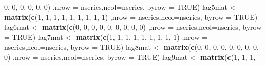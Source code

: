 \documentclass[]{article}
\newenvironment{Shaded}{\begin{snugshade}}{\end{snugshade}}
\newcommand{\KeywordTok}[1]{\textcolor[rgb]{0.13,0.29,0.53}{\textbf{#1}}}
\newcommand{\DataTypeTok}[1]{\textcolor[rgb]{0.13,0.29,0.53}{#1}}
\newcommand{\DecValTok}[1]{\textcolor[rgb]{0.00,0.00,0.81}{#1}}
\newcommand{\StringTok}[1]{\textcolor[rgb]{0.31,0.60,0.02}{#1}}
\newcommand{\OtherTok}[1]{\textcolor[rgb]{0.56,0.35,0.01}{#1}}
\newcommand{\NormalTok}[1]{#1}
\begin{document}
\begin{Shaded}
\begin{Highlighting}[]
                    \DecValTok{0}\NormalTok{, }\DecValTok{0}\NormalTok{, }\DecValTok{0}\NormalTok{,}
                    \DecValTok{0}\NormalTok{, }\DecValTok{0}\NormalTok{, }\DecValTok{0}\NormalTok{)}
\NormalTok{                  ,}\DataTypeTok{nrow =}\NormalTok{ nseries,}\DataTypeTok{ncol=}\NormalTok{nseries, }\DataTypeTok{byrow =} \OtherTok{TRUE}\NormalTok{)}
\NormalTok{lag5mat <-}\StringTok{ }\KeywordTok{matrix}\NormalTok{(}\KeywordTok{c}\NormalTok{(}\DecValTok{1}\NormalTok{, }\DecValTok{1}\NormalTok{, }\DecValTok{1}\NormalTok{,}
                    \DecValTok{1}\NormalTok{, }\DecValTok{1}\NormalTok{, }\DecValTok{1}\NormalTok{,}
                    \DecValTok{1}\NormalTok{, }\DecValTok{1}\NormalTok{, }\DecValTok{1}\NormalTok{)}
\NormalTok{                  ,}\DataTypeTok{nrow =}\NormalTok{ nseries,}\DataTypeTok{ncol=}\NormalTok{nseries, }\DataTypeTok{byrow =} \OtherTok{TRUE}\NormalTok{)}
\NormalTok{lag6mat <-}\StringTok{ }\KeywordTok{matrix}\NormalTok{(}\KeywordTok{c}\NormalTok{(}\DecValTok{0}\NormalTok{, }\DecValTok{0}\NormalTok{, }\DecValTok{0}\NormalTok{,}
                    \DecValTok{0}\NormalTok{, }\DecValTok{0}\NormalTok{, }\DecValTok{0}\NormalTok{,}
                    \DecValTok{0}\NormalTok{, }\DecValTok{0}\NormalTok{, }\DecValTok{0}\NormalTok{)}
\NormalTok{                  ,}\DataTypeTok{nrow =}\NormalTok{ nseries,}\DataTypeTok{ncol=}\NormalTok{nseries, }\DataTypeTok{byrow =} \OtherTok{TRUE}\NormalTok{)}
\NormalTok{lag7mat <-}\StringTok{ }\KeywordTok{matrix}\NormalTok{(}\KeywordTok{c}\NormalTok{(}\DecValTok{1}\NormalTok{, }\DecValTok{1}\NormalTok{, }\DecValTok{1}\NormalTok{,}
                    \DecValTok{1}\NormalTok{, }\DecValTok{1}\NormalTok{, }\DecValTok{1}\NormalTok{,}
                    \DecValTok{1}\NormalTok{, }\DecValTok{1}\NormalTok{, }\DecValTok{1}\NormalTok{)}
\NormalTok{                  ,}\DataTypeTok{nrow =}\NormalTok{ nseries,}\DataTypeTok{ncol=}\NormalTok{nseries, }\DataTypeTok{byrow =} \OtherTok{TRUE}\NormalTok{)}
\NormalTok{lag8mat <-}\StringTok{ }\KeywordTok{matrix}\NormalTok{(}\KeywordTok{c}\NormalTok{(}\DecValTok{0}\NormalTok{, }\DecValTok{0}\NormalTok{, }\DecValTok{0}\NormalTok{,}
                    \DecValTok{0}\NormalTok{, }\DecValTok{0}\NormalTok{, }\DecValTok{0}\NormalTok{,}
                    \DecValTok{0}\NormalTok{, }\DecValTok{0}\NormalTok{, }\DecValTok{0}\NormalTok{)}
\NormalTok{                  ,}\DataTypeTok{nrow =}\NormalTok{ nseries,}\DataTypeTok{ncol=}\NormalTok{nseries, }\DataTypeTok{byrow =} \OtherTok{TRUE}\NormalTok{)}
\NormalTok{lag9mat <-}\StringTok{ }\KeywordTok{matrix}\NormalTok{(}\KeywordTok{c}\NormalTok{(}\DecValTok{1}\NormalTok{, }\DecValTok{1}\NormalTok{, }\DecValTok{1}\NormalTok{,}

\end{Highlighting}
\end{Shaded}
\end{document}
